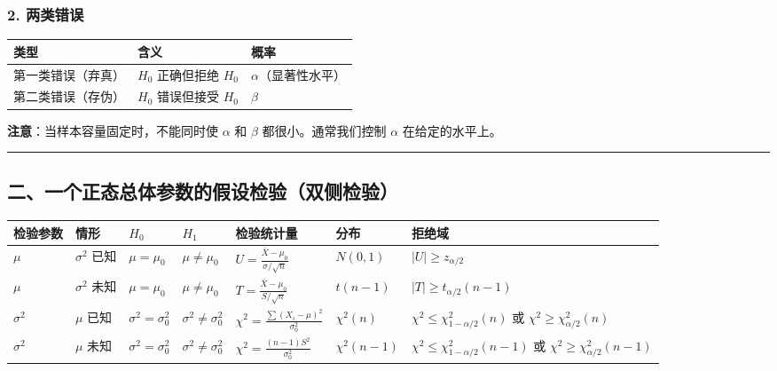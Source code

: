 \documentclass[12pt,a4paper]{ctexart}
\begin{document}
\subsubsection{2. 两类错误}
\begin{center}
    \begin{tabular}{@{}lll@{}}
        \toprule
        \textbf{类型} & \textbf{含义}       & \textbf{概率}     \\ \midrule
        第一类错误（弃真）   & $H_0$ 正确但拒绝 $H_0$ & $\alpha$（显著性水平） \\
        第二类错误（存伪）   & $H_0$ 错误但接受 $H_0$ & $\beta$         \\ \bottomrule
    \end{tabular}
\end{center}

\textbf{注意}：当样本容量固定时，不能同时使 $\alpha$ 和 $\beta$ 都很小。通常我们控制 $\alpha$ 在给定的水平上。

\vspace{1em}\hrule\vspace{1em}

\subsection{二、一个正态总体参数的假设检验（双侧检验）}

\begin{center}
    \begin{tabular}{@{}lllllll@{}}
        \toprule
        \textbf{检验参数} & \textbf{情形}   & \textbf{$H_0$}          & \textbf{$H_1$}            & \textbf{检验统计量}                                   & \textbf{分布}   & \textbf{拒绝域}                                                                \\ \midrule
        $\mu$         & $\sigma^2$ 已知 & $\mu = \mu_0$           & $\mu \ne \mu_0$           & $U = \frac{\bar{X} - \mu_0}{\sigma/\sqrt{n}}$    & $N(0,1)$      & $|U| \ge z_{\alpha/2}$                                                      \\
        $\mu$         & $\sigma^2$ 未知 & $\mu = \mu_0$           & $\mu \ne \mu_0$           & $T = \frac{\bar{X} - \mu_0}{S/\sqrt{n}}$         & $t(n-1)$      & $|T| \ge t_{\alpha/2}(n-1)$                                                 \\
        $\sigma^2$    & $\mu$ 已知      & $\sigma^2 = \sigma_0^2$ & $\sigma^2 \ne \sigma_0^2$ & $\chi^2 = \frac{\sum (X_i - \mu)^2}{\sigma_0^2}$ & $\chi^2(n)$   & $\chi^2 \le \chi^2_{1-\alpha/2}(n)$ 或 $\chi^2 \ge \chi^2_{\alpha/2}(n)$     \\
        $\sigma^2$    & $\mu$ 未知      & $\sigma^2 = \sigma_0^2$ & $\sigma^2 \ne \sigma_0^2$ & $\chi^2 = \frac{(n-1)S^2}{\sigma_0^2}$           & $\chi^2(n-1)$ & $\chi^2 \le \chi^2_{1-\alpha/2}(n-1)$ 或 $\chi^2 \ge \chi^2_{\alpha/2}(n-1)$ \\ \bottomrule
    \end{tabular}
\end{center}
\end{document}

